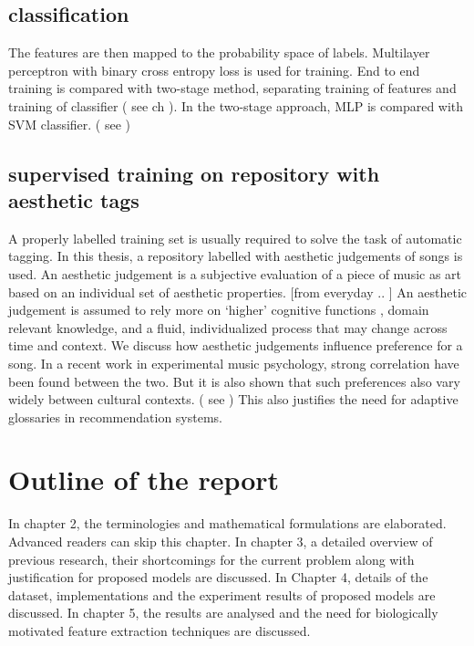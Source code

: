 \subsection{ classification }
The features are then mapped to the probability space of labels. Multilayer perceptron with binary cross entropy loss is used for training. End to end training is compared with two-stage method, separating  training of features and training of classifier ( see ch ). In the two-stage approach, MLP is compared with SVM classifier. ( see )

\subsection{ supervised training on repository with aesthetic tags }
A properly labelled training set is usually required to solve the task of automatic tagging. In this thesis, a repository labelled with aesthetic judgements of songs is used. An aesthetic judgement is a subjective evaluation of a piece of music as art based on an individual set of aesthetic properties. [from everyday .. ] An aesthetic judgement is assumed to rely more on ‘higher’ cognitive functions , domain relevant knowledge, and a fluid, individualized process that may change across time and context. We discuss how aesthetic judgements influence preference for a song. In a recent work in experimental music psychology, strong correlation have been found between the two. But it is also shown that such preferences also vary widely between cultural contexts. ( see ) This also justifies the need for adaptive glossaries in recommendation systems. 


\section{Outline of the report}
In chapter 2, the terminologies and mathematical formulations are elaborated. Advanced readers can skip this chapter. In chapter 3, a detailed overview of previous research, their shortcomings for the current problem along with justification for proposed models are discussed. In Chapter 4, details of the dataset, implementations and the experiment results of proposed models are discussed. In chapter 5, the results are analysed and the need for biologically motivated feature extraction techniques are discussed. 






